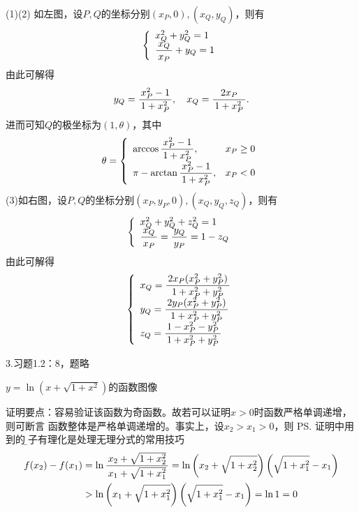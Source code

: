 (1)(2) 如左图，设$P,Q$的坐标分别$(x_P,0),(x_Q,y_Q)$，则有
$$
\left\{
\begin{array}{l}
	x^2_Q+y^2_Q=1\\
	\displaystyle\frac{\,{x_Q}\,}{\,{x_P}\,}+y_Q=1
\end{array}
\right.
$$
由此可解得
$$y_Q=\displaystyle\frac{\,{x^2_P-1}\,}{\,{1+x^2_P}\,},\quad x_Q=\displaystyle\frac{\,{2x_P}\,}{\,{1+x^2_P}\,}.$$
进而可知$Q$的极坐标为$(1,\theta)$，其中
$$\theta=
\left\{
\begin{array}{ll}
	\arccos\displaystyle\frac{\,{x^2_P-1}\,}{\,{1+x^2_P}\,},& x_P\geq 0\\
	\pi-\arctan\displaystyle\frac{\,{x^2_P-1}\,}{\,{1+x^2_P}\,}, & x_P<0
\end{array}
\right.
$$
(3)如右图，设$P,Q$的坐标分别$(x_P,y_P,0),(x_Q,y_Q,z_Q)$，则有
$$
\left\{
\begin{array}{l}
	x^2_Q+y^2_Q+z^2_Q=1\\
	\displaystyle\frac{\,{x_Q}\,}{\,{x_P}\,}=\displaystyle\frac{\,{y_Q}\,}{\,{y_P}\,}=1-z_Q
\end{array}
\right.
$$
由此可解得
$$
\left\{
\begin{array}{l}
	x_Q=\displaystyle\frac{\,{2x_P(x^2_P+y^2_P)}\,}{\,{1+x^2_P+y^2_P}\,}\\
	y_Q=\displaystyle\frac{\,{2y_P(x^2_P+y^2_P)}\,}{\,{1+x^2_P+y^2_P}\,}\\
	z_Q=\displaystyle\frac{\,{1-x^2_P-y^2_P}\,}{\,{1+x^2_P+y^2_P}\,}
\end{array}
\right.
$$

\bigskip

3.习题1.2：8，题略

\begin{center}
	
	$y=\ln(x+\sqrt{1+x^2})$的函数图像
\end{center}

证明要点：容易验证该函数为奇函数。故若可以证明$x>0$时函数严格单调递增，则可断言
函数整体是严格单调递增的。事实上，设$x_2>x_1>0$，则
\ps{证明中用到的{\b 分子有理化}是处理无理分式的常用技巧}
\begin{align}
	f(x_2)-f(x_1)&=\ln\displaystyle\frac{\,{x_2+\sqrt{1+x_2^2}}\,}{\,{x_1+\sqrt{1+x_1^2}}\,}
	=\ln\left(x_2+\sqrt{1+x_2^2}\right)\left(\sqrt{1+x_1^2}-x_1\right)\notag\\
	&>\ln\left(x_1+\sqrt{1+x_1^2}\right)\left(\sqrt{1+x_1^2}-x_1\right)=\ln1=0\notag
\end{align}

